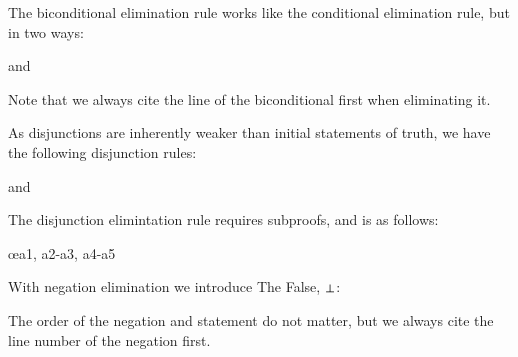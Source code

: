 \documentclass[12pt, a4paper, oneside, openright, titlepage]{book}
\begin{document}
\begin{defn}
    The biconditional elimination rule works like the conditional elimination rule, but in two ways: \begin{fitchproof}
         
    \end{fitchproof}
    and \begin{fitchproof}
         
    \end{fitchproof}
    Note that we always cite the line of the biconditional first when eliminating it.
\end{defn}


\begin{defn}
    As disjunctions are inherently weaker than initial statements of truth, we have the following disjunction rules: \begin{fitchproof}
    \end{fitchproof}
    and \begin{fitchproof}
    \end{fitchproof}
\end{defn}


\begin{defn}
    The disjunction elimintation rule requires subproofs, and is as follows: \begin{fitchproof}
        \open
        \close
        \open
        \close
         \oe{a1, a2-a3, a4-a5}
    \end{fitchproof}
\end{defn}


\begin{defn}
    With negation elimination we introduce The False, $\bot$: \begin{fitchproof}
         
    \end{fitchproof}
    The order of the negation and statement do not matter, but we always cite the line number of the negation first.
\end{defn}
\end{document}
